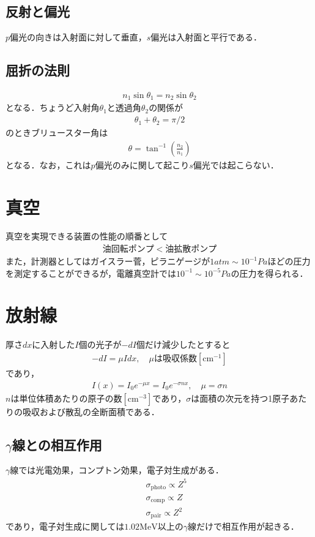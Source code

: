 \documentclass[12pt,dvipdfmx]{jsarticle}
\begin{document}
\subsection*{反射と偏光}
$p$偏光の向きは入射面に対して垂直，$s$偏光は入射面と平行である．
\subsection*{屈折の法則}
\begin{eqnarray}
  n_1 \sin\theta_1 = n_2\sin\theta_2
\end{eqnarray}
となる．ちょうど入射角$\theta_1$と透過角$\theta_2$の関係が
\begin{eqnarray}
  \theta_1 + \theta_2 =\pi/2
\end{eqnarray}
のときブリュースター角は
\begin{eqnarray}
  \theta = \tan^{-1}\left(\frac{n_2}{n_1}\right)
\end{eqnarray}
となる．なお，これは$p$偏光のみに関して起こり$s$偏光では起こらない．
\section*{\Large{真空}}
真空を実現できる装置の性能の順番として
\begin{eqnarray}
  油回転ポンプ < 油拡散ポンプ
\end{eqnarray}
また，計測器としてはガイスラー菅，ピラニゲージが$1atm\sim 10^{-1}Pa$ほどの圧力を測定することができるが，電離真空計では$10^{-1}\sim 10^{-5}Pa$の圧力を得られる．

\section*{\Large{放射線}}
厚さ$dx$に入射した$I$個の光子が$-dI$個だけ減少したとすると
\begin{eqnarray}
  -dI = \mu I dx,\quad \mu は吸収係数[\text{cm}{}^{-1}]
\end{eqnarray}
であり，
\begin{eqnarray}
  I(x) = I_0 e^{-\mu x} = I_0 e^{-\sigma nx},\quad \mu= \sigma n
\end{eqnarray}
$n$は単位体積あたりの原子の数$[\text{cm}{}^{-3}]$であり，$\sigma$は面積の次元を持つ1原子あたりの吸収および散乱の全断面積である．
\subsection*{$\gamma$線との相互作用}
$\gamma$線では光電効果，コンプトン効果，電子対生成がある．
\begin{eqnarray}
  &&\sigma_{\text{photo}} \propto Z^5\\
  &&\sigma_{\text{comp}} \propto Z\\
  &&\sigma_{\text{pair}} \propto Z^2
\end{eqnarray}
であり，電子対生成に関しては$1.02\text{MeV}$以上の$\gamma$線だけで相互作用が起きる．
\end{document}
